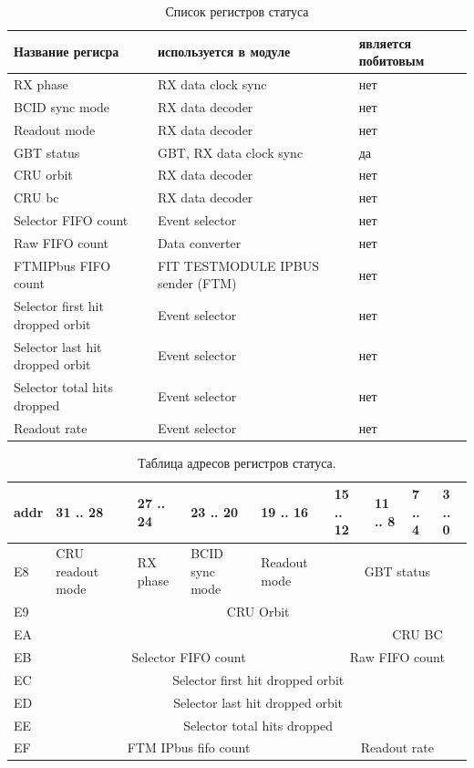 \documentclass{article}
\begin{document}
\begin{table}[H]
\centering
\begin{tabular}{| l | l | l |}
\hline
Название регисра & используется в модуле & является побитовым \\ \hline
RX phase & RX data clock sync & нет \\ \hline
BCID sync mode & RX data decoder & нет \\ \hline
Readout mode & RX data decoder & нет \\ \hline
GBT status & GBT, RX data clock sync & да \\ \hline
CRU orbit & RX data decoder & нет \\ \hline
CRU bc & RX data decoder & нет \\ \hline
Selector FIFO count & Event selector & нет \\ \hline
Raw FIFO count & Data converter & нет \\ \hline
FTMIPbus FIFO count & FIT TESTMODULE IPBUS sender (FTM) & нет \\ \hline
Selector first hit dropped orbit & Event selector & нет \\ \hline
Selector last hit dropped orbit & Event selector & нет \\ \hline
Selector total hits dropped & Event selector & нет \\ \hline
Readout rate & Event selector & нет \\ \hline
\end{tabular}
\caption{Список регистров статуса\label{tab8}}
\end{table}


\begin{table}[H]
\centering
\begin{tabular}{| l | l | l | l | l | l | l | l | l |}
\hline
addr & 31 .. 28 & 27 .. 24 & 23 .. 20 & 19 .. 16 & 15 .. 12 & 11 .. 8 & 7 .. 4 & 3 .. 0 \\ \hline
E8 & CRU readout mode & RX phase & BCID sync mode & Readout mode & \multicolumn{4}{c|}{GBT status}\\ \hline
E9 &  \multicolumn{8}{c|}{CRU Orbit} \\\hline
EA &  & & & & & \multicolumn{3}{c|}{CRU BC} \\\hline
EB &  \multicolumn{4}{c|}{Selector FIFO count} &  \multicolumn{4}{c|}{Raw FIFO count} \\\hline
EC &  \multicolumn{8}{c|}{Selector first hit dropped orbit} \\\hline
ED &  \multicolumn{8}{c|}{Selector last hit dropped orbit} \\\hline
EE &  \multicolumn{8}{c|}{Selector total hits dropped} \\ \hline
EF &  \multicolumn{4}{c|}{FTM IPbus fifo count} & \multicolumn{4}{c|}{Readout rate} \\ \hline
\end{tabular}
\caption{Таблица адресов регистров статуса.\label{tab9}}
\end{table}
\end{document}
